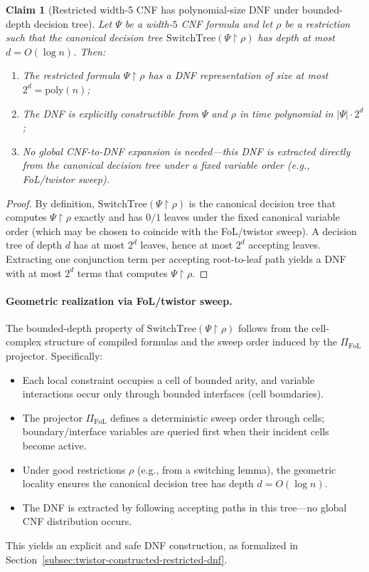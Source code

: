 \documentclass[12pt]{article}
\newtheorem{claim}[theorem]{Claim}
\theoremstyle{definition}
\theoremstyle{definition}
\theoremstyle{remark}
\theoremstyle{remark}
\begin{document}
\begin{claim}[Restricted width-5 CNF has polynomial-size DNF under bounded-depth decision tree]
\label{clm:restricted-cnf-dnf-size}
Let $\Psi$ be a width-$5$ CNF formula and let $\rho$ be a restriction such that the canonical decision tree $\mathrm{SwitchTree}(\Psi\!\upharpoonright\!\rho)$ has depth at most $d = O(\log n)$. Then:

\begin{enumerate}
\item The restricted formula $\Psi\!\upharpoonright\!\rho$ has a DNF representation of size at most $2^d = \mathrm{poly}(n)$;
\item The DNF is explicitly constructible from $\Psi$ and $\rho$ in time polynomial in $|\Psi|\cdot 2^d$;
\item No global CNF-to-DNF expansion is needed---this DNF is extracted directly from the canonical decision tree under a fixed variable order (e.g., FoL/twistor sweep).
\end{enumerate}
\end{claim}

\begin{proof}
By definition, $\mathrm{SwitchTree}(\Psi\!\upharpoonright\!\rho)$ is the canonical decision tree
that computes $\Psi\!\upharpoonright\!\rho$ exactly and has $0/1$ leaves under the fixed canonical
variable order (which may be chosen to coincide with the FoL/twistor sweep).
A decision tree of depth $d$ has at most $2^d$ leaves, hence at most $2^d$ accepting leaves.
Extracting one conjunction term per accepting root-to-leaf path yields a DNF with at most $2^d$
terms that computes $\Psi\!\upharpoonright\!\rho$.
\end{proof}

\paragraph{Geometric realization via FoL/twistor sweep.}
The bounded-depth property of $\mathrm{SwitchTree}(\Psi\!\upharpoonright\!\rho)$ follows from
the cell-complex structure of compiled formulas and the sweep order induced by the
$\Pi_{\mathrm{FoL}}$ projector. Specifically:
\begin{itemize}
\item Each local constraint occupies a cell of bounded arity, and variable interactions occur only through bounded interfaces (cell boundaries).
\item The projector $\Pi_{\mathrm{FoL}}$ defines a deterministic sweep order through cells; boundary/interface variables are queried first when their incident cells become active.
\item Under good restrictions $\rho$ (e.g., from a switching lemma), the geometric locality ensures the canonical decision tree has depth $d = O(\log n)$.
\item The DNF is extracted by following accepting paths in this tree---no global CNF distribution occurs.
\end{itemize}
This yields an explicit and safe DNF construction, as formalized in Section~\ref{subsec:twistor-constructed-restricted-dnf}.
\end{document}

